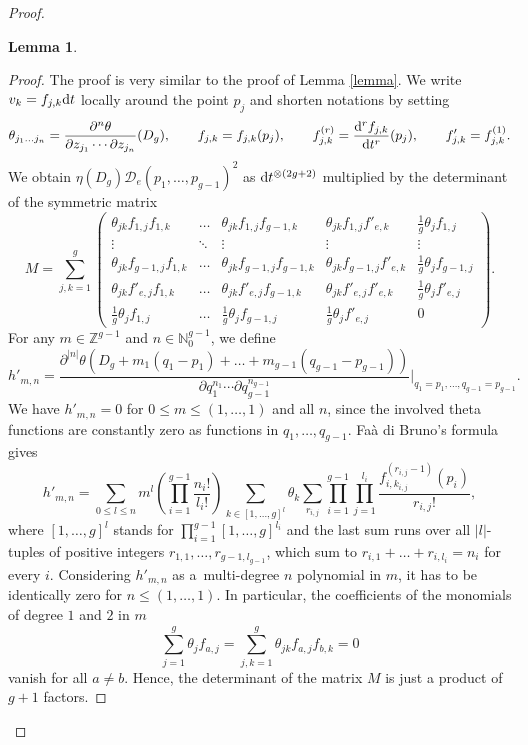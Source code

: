 \documentclass[10pt,a4paper]{amsart}
\numberwithin{equation}{section}
\newtheorem{Lemma}[Theorem]{Lemma}
\begin{document}
\begin{proof}
\begin{Lemma}
	\end{Lemma}
	\begin{proof}
		The proof is very similar to the proof of Lemma \ref{lemma}.
		We write $v_k=f_{j,k}{\rm d}t$ locally around the point $p_j$ and shorten notations by setting
		\[
\theta_{j_1\dots j_n}=\frac{\partial^n\theta}{\partial z_{j_1}\cdots \partial z_{j_n}} (D_g),\qquad f_{j,k}=f_{j,k}(p_j),\qquad f^{(r)}_{j,k}=\frac{{\rm d}^rf_{j,k}}{{\rm d}t^r}(p_j), \qquad f'_{j,k}=f^{(1)}_{j,k}.\]
		We obtain $\eta(D_g)\mathscr{D}_e(p_1,\dots,p_{g-1})^2$ as ${\rm d}t^{\otimes(2g+2)}$ multiplied by the determinant of the symmetric matrix
		\[M=\sum_{j,k=1}^g\begin{pmatrix}\theta_{jk}f_{1,j} f_{1,k} & \dots & \theta_{jk}f_{1,j} f_{g-1,k} & \theta_{jk}f_{1,j} f'_{e,k} & \frac{1}{g}\theta_j f_{1,j}\\
			\vdots&\ddots&\vdots&\vdots&\vdots\\
			\theta_{jk}f_{g-1,j} f_{1,k} & \dots &\theta_{jk}f_{g-1,j}f_{g-1,k}&\theta_{jk}f_{g-1,j}f'_{e,k}& \frac{1}{g}\theta_j f_{g-1,j}\\
			\theta_{jk}f'_{e,j}f_{1,k}&\dots&\theta_{jk}f'_{e,j}f_{g-1,k}&\theta_{jk}f'_{e,j}f'_{e,k}&\frac{1}{g}\theta_j f'_{e,j}\\
			\frac{1}{g}\theta_{j} f_{1,j} & \dots & \frac{1}{g}\theta_{j}f_{g-1,j} &\frac{1}{g}\theta_{j}f'_{e,j}& 0\end{pmatrix}.\]
		For any $m\in\mathbb{Z}^{g-1}$ and $n\in \mathbb{N}_0^{g-1}$, we define
		\[h'_{m,n}=\frac{\partial^{|n|}\theta(D_g+m_1(q_1-p_1)+\dots+m_{g-1}(q_{g-1}-p_{g-1}))}{\partial q_1^{n_1}\cdots\partial q_{g-1}^{n_{g-1}}}\Big|_{q_1=p_1,\dots,q_{g-1}=p_{g-1}}.\]
		We have $h'_{m,n}=0$ for $0\le m\le (1,\dots,1)$ and all $n$, since the involved theta functions are constantly zero as functions in $q_1,\dots,q_{g-1}$. Fa\`a di Bruno's formula gives
		\[h'_{m,n}=\sum_{0\le l\le n} m^l\left(\prod_{i=1}^{g-1}\frac{n_i!}{l_i!}\right)\sum_{k\in [1,\dots,g]^{l}}\theta_k\sum_{r_{i,j}}\prod_{i=1}^{g-1}\prod_{j=1}^{l_i}\frac{f_{i,k_{i,j}}^{(r_{i,j}-1)}(p_i)}{r_{i,j}!},\]
		where $[1,\dots,g]^{l}$ stands for $\prod_{i=1}^{g-1} [1,\dots,g]^{l_i}$ and the last sum runs over all $|l|$-tuples of positive integers $r_{1,1},\dots,r_{g-1,l_{g-1}}$, which sum to $r_{i,1}+\dots+r_{i,l_i}=n_i$ for every $i$. Considering $h'_{m,n}$ as a~multi-degree $n$ polynomial in $m$, it has to be identically zero for $n\le (1,\dots,1)$. In particular, the coefficients of the monomials of degree $1$ and $2$ in $m$
		\[\sum_{j=1}^g\theta_j f_{a,j}=\sum_{j,k=1}^g \theta_{jk}f_{a,j}f_{b,k}=0\]
		vanish for all $a\neq b$. Hence, the determinant of the matrix $M$ is just a product of $g+1$ factors.
		

\end{proof}
\end{proof}
\end{document}
